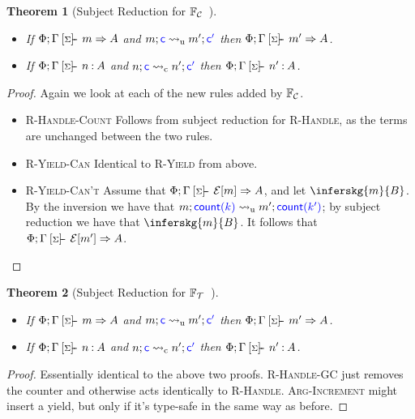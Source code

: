 \documentclass[msc,deptreport,cs]{infthesis} %
\newtheorem*{theorem*}{Theorem}
\newcommand\countingfrank{$\mathbb{F}_{\cal{C}}$}
\newcommand\treefrank{$\mathbb{F}_{\cal{T}}$}
\newcommand{\counter}{{\color{blue} \textsf{c}}}
\newcommand{\justc}[1]{{\color{blue} \textsf{count}({#1})}}
\newcommand{\bluetext}[1]{{\color{blue}#1}}
\newcommand\yield{\textsf{yield}\xspace}
\newcommand\Cse{\textbf{Case}}
\newcommand{\sigentails}[1]{\mathbin{[{\text{\scriptsize ${#1}$}}]\hspace{-0.4ex}\text{-\!-}}\,}
\newcommand{\inferbase}[5]{#1; #3 \mathbin{#2} {#4} \Rightarrow {#5}}
\newcommand{\checkbase}[5]{#1; #3 \mathbin{#2} #5 \mathbin{:} #4}
\newcommand{\makes}[5]{\inferbase{#1}{\sigentails{#3}}{#2}{#4}{#5}}
\newcommand{\has}[5]{\checkbase{#1}{\sigentails{#3}}{#2}{#4}{#5}}
\newcommand{\inferskgs}{\makes{\kenv}{\Gamma}{\sigs}}
\newcommand{\checkskgs}{\has{\kenv}{\Gamma}{\sigs}}
\newcommand{\sigs}{\Sigma}
\newcommand{\EC}{\mathcal{E}}
\newcommand{\redtou}{\leadsto_{\mathrm{u}}}
\newcommand{\redtoc}{\leadsto_{\mathrm{c}}}
\newcommand{\kenv}{\Phi}  %
\begin{document}
\begin{theorem*}[Subject Reduction for \countingfrank{}~]~

\begin{itemize}
\item If $\inferskgs{m}{A}$ and $m; \counter \redtou m'; \counter \bluetext{'}$ then $\inferskgs{m'}{A}$.
\item If $\checkskgs{A}{n}$ and $n; \counter \redtoc n'; \bluetext{\counter'}$ then $\checkskgs{A}{n'}$.
\end{itemize}
\end{theorem*}
\begin{proof}
  Again we look at each of the new rules added by \countingfrank.

  \begin{itemize}
    \item[\Cse] \textsc{R-Handle-Count} Follows from subject reduction for
      \textsc{R-Handle}, as the terms are unchanged between the two rules.

    \item[\Cse] \textsc{R-Yield-Can} Identical to \textsc{R-Yield} from above.

    \item[\Cse] \textsc{R-Yield-Can't} Assume that $\inferskgs{\EC[m]}{A}$, and
      let $\inferskg{m}{B}$. By the inversion we have that
      $m; \justc{k} \redtou m'; \justc{k'}$; by subject reduction we have that $\inferskg{m}{B}$. It follows that $\inferskgs{\EC[m']}{A}$.
  \end{itemize}

\end{proof}


\begin{theorem*}[Subject Reduction for \treefrank{}~]~

\begin{itemize}
\item If $\inferskgs{m}{A}$ and $m; \counter \redtou m'; \counter \bluetext{'}$ then $\inferskgs{m'}{A}$.
\item If $\checkskgs{A}{n}$ and $n; \counter \redtoc n'; \bluetext{\counter'}$ then $\checkskgs{A}{n'}$.
\end{itemize}
\end{theorem*}
\begin{proof}
  Essentially identical to the above two proofs. \textsc{R-Handle-GC} just
  removes the counter and otherwise acts identically to \textsc{R-Handle}.
  \textsc{Arg-Increment} might insert a \yield, but only if it's type-safe in
  the same way as before.
\end{proof}
\end{document}
